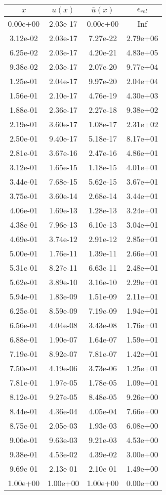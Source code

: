 \begin{tabular}{|c|c|c|c|}
\hline
\textbf{$x$}&\textbf{$u(x)$}&\textbf{$\bar{u}(x)$}&\textbf{$\epsilon_{rel}$}\\\hline
0.00e+00&2.03e-17&0.00e+00&Inf\\\hline
3.12e-02&2.03e-17&7.27e-22&2.79e+06\\\hline
6.25e-02&2.03e-17&4.20e-21&4.83e+05\\\hline
9.38e-02&2.03e-17&2.07e-20&9.77e+04\\\hline
1.25e-01&2.04e-17&9.97e-20&2.04e+04\\\hline
1.56e-01&2.10e-17&4.76e-19&4.30e+03\\\hline
1.88e-01&2.36e-17&2.27e-18&9.38e+02\\\hline
2.19e-01&3.60e-17&1.08e-17&2.31e+02\\\hline
2.50e-01&9.40e-17&5.18e-17&8.17e+01\\\hline
2.81e-01&3.67e-16&2.47e-16&4.86e+01\\\hline
3.12e-01&1.65e-15&1.18e-15&4.01e+01\\\hline
3.44e-01&7.68e-15&5.62e-15&3.67e+01\\\hline
3.75e-01&3.60e-14&2.68e-14&3.44e+01\\\hline
4.06e-01&1.69e-13&1.28e-13&3.24e+01\\\hline
4.38e-01&7.96e-13&6.10e-13&3.04e+01\\\hline
4.69e-01&3.74e-12&2.91e-12&2.85e+01\\\hline
5.00e-01&1.76e-11&1.39e-11&2.66e+01\\\hline
5.31e-01&8.27e-11&6.63e-11&2.48e+01\\\hline
5.62e-01&3.89e-10&3.16e-10&2.29e+01\\\hline
5.94e-01&1.83e-09&1.51e-09&2.11e+01\\\hline
6.25e-01&8.59e-09&7.19e-09&1.94e+01\\\hline
6.56e-01&4.04e-08&3.43e-08&1.76e+01\\\hline
6.88e-01&1.90e-07&1.64e-07&1.59e+01\\\hline
7.19e-01&8.92e-07&7.81e-07&1.42e+01\\\hline
7.50e-01&4.19e-06&3.73e-06&1.25e+01\\\hline
7.81e-01&1.97e-05&1.78e-05&1.09e+01\\\hline
8.12e-01&9.27e-05&8.48e-05&9.26e+00\\\hline
8.44e-01&4.36e-04&4.05e-04&7.66e+00\\\hline
8.75e-01&2.05e-03&1.93e-03&6.08e+00\\\hline
9.06e-01&9.63e-03&9.21e-03&4.53e+00\\\hline
9.38e-01&4.53e-02&4.39e-02&3.00e+00\\\hline
9.69e-01&2.13e-01&2.10e-01&1.49e+00\\\hline
1.00e+00&1.00e+00&1.00e+00&0.00e+00\\\hline
\end{tabular}
